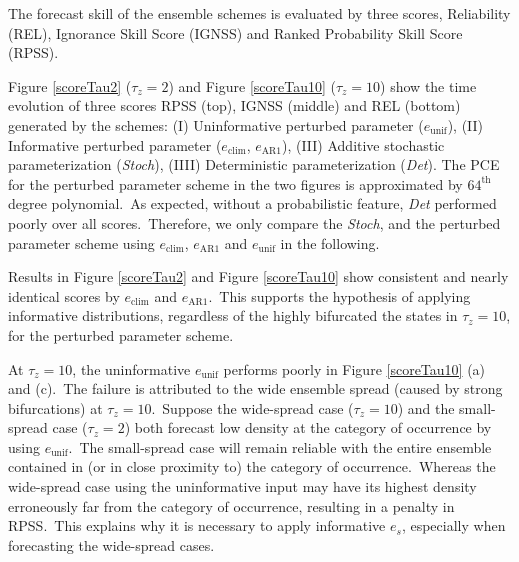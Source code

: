 
	The forecast skill of the ensemble schemes is evaluated by three scores,
	Reliability (REL), Ignorance Skill Score (IGNSS) and Ranked Probability Skill Score (RPSS).\


	
	Figure {\ref{scoreTau2}} ($\tau_z=2$) and Figure {\ref{scoreTau10}} ($\tau_z=10$) 
	show the time evolution of three scores 
	RPSS (top), IGNSS (middle) and REL (bottom) generated by the schemes:
	(I) Uninformative perturbed parameter ($e_{\text{unif}}$),
	(II) Informative perturbed parameter ($e_{\text{clim}}$, $e_{\text{AR1}}$), 
	(III) Additive stochastic parameterization (\emph{Stoch}), 
	(IIII) Deterministic parameterization (\emph{Det}). 
	The PCE for the perturbed parameter scheme in the two figures is approximated by $64^{\text{th}}$ degree polynomial.\
	As expected, without a probabilistic feature, \emph{Det} performed poorly over all scores.\
	Therefore, we only compare the \emph{Stoch}, and the perturbed parameter scheme using  
	$e_{\text{clim}}$, $e_{\text{AR1}}$ and $e_{\text{unif}}$ in the following.\


	Results in Figure {\ref{scoreTau2}} and Figure {\ref{scoreTau10}}
	show consistent and nearly identical scores by $e_{\text{clim}}$ and $e_{\text{AR1}}$.\
	This supports the hypothesis of applying informative distributions, regardless of the
	highly bifurcated the states in $\tau_z=10$, for the perturbed parameter scheme.

	At $\tau_z=10$, the uninformative $e_{\text{unif}}$ performs poorly in Figure {\ref{scoreTau10}} (a) and (c).\
	The failure is attributed to the wide ensemble spread (caused by strong bifurcations) at $\tau_z=10$.\
	Suppose the wide-spread case ($\tau_z=10$) and 
	the small-spread case ($\tau_z=2$) both forecast low density 
	at the category of occurrence by using $e_{\text{unif}}$.\
	The small-spread case will remain reliable with the entire ensemble
	contained in (or in close proximity to) the category of occurrence.\
	Whereas the wide-spread case using the uninformative input may have its highest density 
	erroneously far from the category of occurrence, resulting in a penalty in RPSS.\
	This explains why it is necessary to apply informative $e_s$, 
	especially when forecasting the wide-spread cases.\ 

